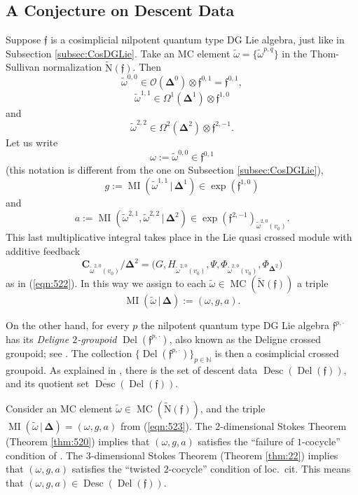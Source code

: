 \documentclass[10pt, a4paper]{amsart}
\theoremstyle{definition}
\numberwithin{equation}{section}
\newcommand{\opn}{\operatorname}
\newcommand{\bdot}{\bsym{\cdot}}
\newcommand{\ol}{\overline}
\newcommand{\mfrak}[1]{\mathfrak{#1}}
\newcommand{\mcal}[1]{\mathcal{#1}}
\newcommand{\mbf}[1]{\mathbf{#1}}
\newcommand{\mrm}[1]{\mathrm{#1}}
\newcommand{\mbb}[1]{\mathbb{#1}}
\newcommand{\bsym}[1]{\boldsymbol{#1}}
\newcommand{\til}[1]{\tilde{#1}}
\renewcommand{\vert}{\, | \,}
\newcommand{\N}{\mbb{N}}
\newcommand{\f}{\mfrak{f}}
\begin{document}
\subsection{A Conjecture on Descent Data} \label{subsec:conj.desc}
Suppose $\f$ is a  cosimplicial nilpotent quantum type DG Lie algebra, just
like in Subsection \ref{subsec:CosDGLie}. Take an MC element 
$\til{\omega} = \{ \til{\omega}^{p, q} \}$ in the
Thom-Sullivan normalization $\til{\mrm{N}}(\f)$.
Then 
\[ \til{\omega}^{0, 0} \in \mcal{O}(\bsym{\Delta}^0) \otimes \f^{0, 1}
= \f^{0, 1} , \] %
\[ \til{\omega}^{1, 1} \in \Omega^1(\bsym{\Delta}^1) \otimes \f^{1, 0} \]
and 
\[ \til{\omega}^{2, 2} \in \Omega^2(\bsym{\Delta}^2) \otimes \f^{2, -1} . \]
Let us write 
\[ \omega := \til{\omega}^{0, 0} \in \f^{0, 1}  \]
(this notation is different from the one on Subsection \ref{subsec:CosDGLie}),
\[ g := \opn{MI}( \til{\omega}^{1, 1} \vert \bsym{\Delta}^1) \in 
\opn{exp}(\f^{1, 0}) \]
and 
\[ a :=  \opn{MI}( \til{\omega}^{2, 1} , \til{\omega}^{2, 2} 
\vert \bsym{\Delta}^2 ) \in 
\opn{exp}(\f^{2, -1})_{\til{\omega}^{2, 0}(v_0)}  . \]
This last multiplicative integral takes place in the Lie quasi crossed module
with additive feedback 
\[  \mbf{C}_{\til{\omega}^{2, 0}(v_0)}   / \bsym{\Delta}^2  =  
\bigl( G, H_{\til{\omega}^{2, 0}(v_0)}, 
\Psi, \Phi_{\til{\omega}^{2, 0}(v_0)}, \Phi_{\bsym{\Delta}^2} \bigr)  \]
as in (\ref{eqn:522}). In this way we assign to each 
$\til{\omega} \in \opn{MC}(\til{\mrm{N}}(\f))$ a triple 
\begin{equation} \label{eqn:523}
\opn{MI}(\til{\omega} \vert \bsym{\Delta}) := (\omega, g, a) .
\end{equation}

On the other hand, for every $p$ the nilpotent quantum type DG Lie algebra 
$\f^{p, \bdot}$ has its {\em Deligne $2$-groupoid} 
$\opn{Del}(\f^{p, \bdot})$, also known as the Deligne crossed groupoid; see 
\cite[Section 6]{Ye5}. The collection 
$\{ \opn{Del}(\f^{p, \bdot}) \}_{p \in \N}$ is then a cosimplicial crossed
groupoid. As explained in \cite[Section 5]{Ye3}, there is the set of
descent data 
$\opn{Desc}(\opn{Del}(\f))$, and its quotient set 
$\ol{\opn{Desc}}(\opn{Del}(\f))$.

Consider an MC element $\til{\omega} \in \opn{MC}(\til{\mrm{N}}(\f))$, 
and the triple 
$\opn{MI}(\til{\omega} \vert \bsym{\Delta}) = (\omega, g, a)$ from
(\ref{eqn:523}). The $2$-dimensional Stokes Theorem 
(Theorem \ref{thm:520}) implies that $(\omega, g, a)$ satisfies the ``failure
of $1$-cocycle'' condition of \cite[Definition 5.2]{Ye3}.
The $3$-dimensional Stokes Theorem (Theorem \ref{thm:22}) implies that 
$(\omega, g, a)$ satisfies the ``twisted $2$-cocycle'' condition of loc.\ cit.
This means that 
$(\omega, g, a) \in \opn{Desc}(\opn{Del}(\f))$.
\end{document}
